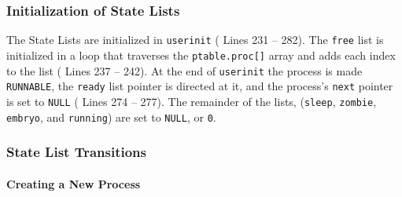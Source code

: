 \documentclass[11pt,letterpaper]{report}
\begin{document}
	\subsubsection{Initialization of State Lists}
	
	The State Lists are initialized in {\tt userinit} ({\color{red} Lines 231 -- 282}). The {\tt free} list is initialized in a loop that traverses the {\tt ptable.proc[]} array and adds each index to the list ({\color{red} Lines 237 -- 242}). At the end of {\tt userinit} the process is made {\tt RUNNABLE}, the {\tt ready} list pointer is directed at it, and the process's {\tt next} pointer is set to {\tt NULL} ({\color{red} Lines 274 -- 277}). The remainder of the lists, ({\tt sleep}, {\tt zombie}, {\tt embryo}, and {\tt running}) are set to {\tt NULL}, or {\tt 0}.
	
	\subsubsection{State List Transitions}
	
	\paragraph{Creating a New Process}
	
\end{document}
